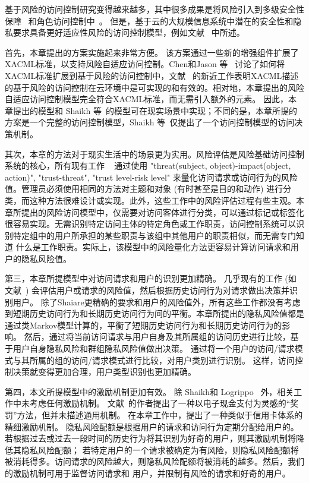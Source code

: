 基于风险的访问控制研究变得越来越多，其中很多成果是将风险引入到多级安全性保障~\cite{cheng2007fuzzy,ni2010risk} 和角色访问控制中~\cite{chen2011risk,choi2015framework}。 但是，基于云的大规模信息系统中潜在的安全性和隐私要求具备更好适应性风险的访问控制模型，例如文献~\cite{wang2011quantified,shaikh2012dynamic,khambhammettu2013framework} 中所述。

首先，本章提出的方案实施起来非常方便。 该方案通过一些新的增强组件扩展了XACML标准，以支持风险自适应访问控制。Chen和Jason 等~\cite{Chen2013} 讨论了如何将XACML标准扩展到基于风险的访问控制中，文献~\cite{santos2014dynamic} 的新近工作表明XACML描述的基于风险的访问控制在云环境中是可实现的和有效的。相对地，本章提出的风险自适应访问控制模型完全符合XACML标准，而无需引入额外的元素。 因此，本章提出的模型和 Shaikh 等~\cite{shaikh2012dynamic}的模型可在现实场景中实现；不同的是，本章所提的方案是一个完整的访问控制模型，Shaikh 等~\cite{shaikh2012dynamic}仅提出了一个访问控制模型的访问决策机制。

其次，本章的方法对于现实生活中的场景更为实用。风险评估是风险基础访问控制系统的核心，所有现有工作 ~\cite{wang2011quantified, shaikh2012dynamic, khambhammettu2013framework} 通过使用 "threat(subject, object)-impact(object, action)", "trust-threat", "trust level-risk level" 来量化访问请求或访问行为的风险值。管理员必须使用相同的方法对主题和对象 (有时甚至是目的和动作) 进行分类，而这种方法很难设计或实现。此外，这些工作中的风险评估过程有些主观。本章所提出的风险访问模型中，仅需要对访问客体进行分类，可以通过标记或标签化很容易实现。无需识别特定访问主体的特定角色或工作职责，访问控制系统可以识别特定组中的用户所承担的某些职责与该组中其他用户的职责相似，而无需专门知道 什么是工作职责。实际上，该模型中的风险量化方法更容易计算访问请求和用户的隐私风险值。

第三，本章所提模型中对访问请求和用户的识别更加精确。 几乎现有的工作 (如文献~\cite{wang2011quantified,shaikh2012dynamic}) 会评估用户或请求的风险值，然后根据历史访问行为对请求做出决策并识别用户。 除了Shaiare更精确的要求和用户的风险值外，所有这些工作都没有考虑到短期历史访问行为和长期历史访问行为间的平衡。本章所提出的隐私风险值都是通过类Markov模型计算的，平衡了短期历史访问行为和长期历史访问行为的影响。 然后，通过将当前访问请求与用户自身及其所属组的访问历史进行比较，基于用户自身隐私风险和群组隐私风险值做出决策。 通过将一个用户的访问/请求模式与其所属的组的访问/请求模式进行比较，对用户类别进行识别。 这样，访问控制决策就变得更加合理，用户类型识别也更加精确。

第四，本文所提模型中的激励机制更加有效。 除 Shaikh和 Logrippo ~\cite{shaikh2012dynamic}外，相关工作中未考虑任何激励机制。 文献~\cite{shaikh2012dynamic}的作者提出了一种以电子现金支付为灵感的“奖罚”方法，但并未描述通用机制。 在本章工作中，提出了一种类似于信用卡体系的精细激励机制。 隐私风险配额是根据用户的请求和访问行为定期分配给用户的。 若根据过去或过去一段时间的历史行为将其识别为好奇的用户，则其激励机制将降低其隐私风险配额； 若特定用户的一个请求被确定为有风险，则隐私风险配额将被消耗得多。访问请求的风险越大，则隐私风险配额将被消耗的越多。然后，我们的激励机制可用于监督访问请求和 用户，并限制有风险的请求和好奇的用户。

